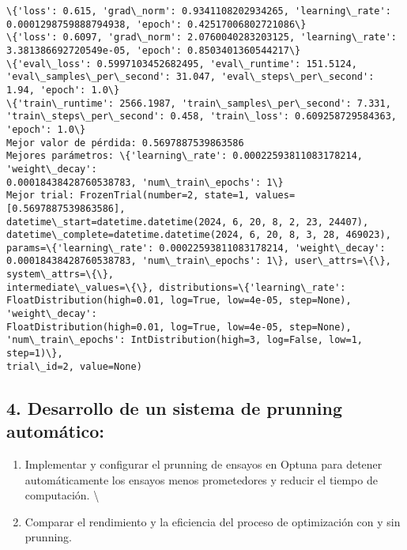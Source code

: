 \documentclass[11pt]{article}
\providecommand{\tightlist}{%
      \setlength{\itemsep}{0pt}\setlength{\parskip}{0pt}}
\begin{document}
    \begin{Verbatim}[commandchars=\\\{\}]
\{'loss': 0.615, 'grad\_norm': 0.9341108202934265, 'learning\_rate':
0.0001298759888794938, 'epoch': 0.42517006802721086\}
\{'loss': 0.6097, 'grad\_norm': 2.0760040283203125, 'learning\_rate':
3.381386692720549e-05, 'epoch': 0.8503401360544217\}
\{'eval\_loss': 0.5997103452682495, 'eval\_runtime': 151.5124,
'eval\_samples\_per\_second': 31.047, 'eval\_steps\_per\_second': 1.94, 'epoch': 1.0\}
\{'train\_runtime': 2566.1987, 'train\_samples\_per\_second': 7.331,
'train\_steps\_per\_second': 0.458, 'train\_loss': 0.609258729584363, 'epoch': 1.0\}
Mejor valor de pérdida: 0.5697887539863586
Mejores parámetros: \{'learning\_rate': 0.00022593811083178214, 'weight\_decay':
0.00018438428760538783, 'num\_train\_epochs': 1\}
Mejor trial: FrozenTrial(number=2, state=1, values=[0.5697887539863586],
datetime\_start=datetime.datetime(2024, 6, 20, 8, 2, 23, 24407),
datetime\_complete=datetime.datetime(2024, 6, 20, 8, 3, 28, 469023),
params=\{'learning\_rate': 0.00022593811083178214, 'weight\_decay':
0.00018438428760538783, 'num\_train\_epochs': 1\}, user\_attrs=\{\}, system\_attrs=\{\},
intermediate\_values=\{\}, distributions=\{'learning\_rate':
FloatDistribution(high=0.01, log=True, low=4e-05, step=None), 'weight\_decay':
FloatDistribution(high=0.01, log=True, low=4e-05, step=None),
'num\_train\_epochs': IntDistribution(high=3, log=False, low=1, step=1)\},
trial\_id=2, value=None)
    \end{Verbatim}

    \hypertarget{desarrollo-de-un-sistema-de-prunning-automuxe1tico}{%
\subsection{4. Desarrollo de un sistema de prunning
automático:}\label{desarrollo-de-un-sistema-de-prunning-automuxe1tico}}

    \begin{enumerate}
\def\labelenumi{\alph{enumi}.}
\tightlist
\item
  Implementar y configurar el prunning de ensayos en Optuna para detener
  automáticamente los ensayos menos prometedores y reducir el tiempo de
  computación. \textbackslash{}
\item
  Comparar el rendimiento y la eficiencia del proceso de optimización
  con y sin prunning.
\end{enumerate}
\end{document}
